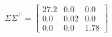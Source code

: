 \documentclass[preview]{standalone}
\begin{document}
\begin{align*}
\Sigma\Sigma^\top=\left[\begin{matrix}27.2&0.0&0.0\\0.0&0.02&0.0\\0.0&0.0&1.78\end{matrix}\right]
\end{align*}
\end{document}
